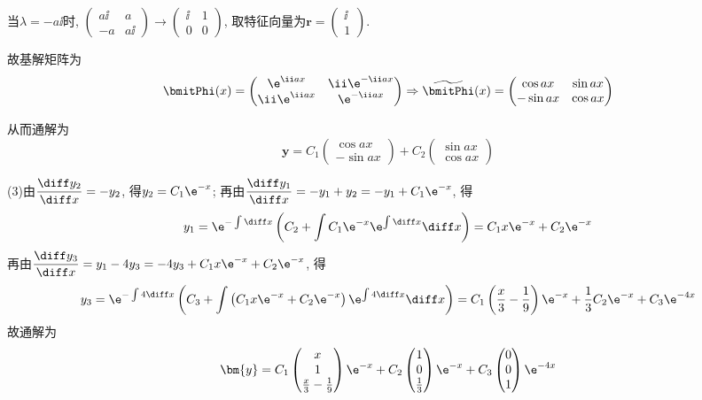 \begin{solve}
当$\lambda=-a\ii$时, $\begin{pmatrix}a\ii&a\\-a&a\ii\end{pmatrix}\to\begin{pmatrix}\ii&1\\0&0\end{pmatrix}$, 
取特征向量为$\bm{r}=\begin{pmatrix}\ii\\1\end{pmatrix}$.

故基解矩阵为
\[\bmitPhi(x)=\begin{pmatrix}\e^{\ii ax}&\ii\e^{-\ii ax}\\\ii\e^{\ii ax}&\e^{-\ii ax}\end{pmatrix}\Rightarrow\widetilde{\bmitPhi}(x)=\begin{pmatrix}\cos ax&\sin ax\\-\sin ax&\cos ax\end{pmatrix}\]

从而通解为
\[\bm{y}=C_1\begin{pmatrix}\cos ax\\-\sin ax\end{pmatrix}+C_2\begin{pmatrix}\sin ax\\\cos ax\end{pmatrix}\]

(3)由$\displaystyle\frac{\diff y_2}{\diff x}=-y_2$, 得$y_2=C_1\e^{-x}$; 
再由$\displaystyle\frac{\diff y_1}{\diff x}=-y_1+y_2=-y_1+C_1\e^{-x}$, 得
\[\displaystyle y_1=\e^{-\int\diff x}\left(C_2+\int C_1\e^{-x}\e^{\int\diff x}\diff x\right)=C_1x\e^{-x}+C_2\e^{-x}\]
再由$\displaystyle\frac{\diff y_3}{\diff x}=y_1-4y_3=-4y_3+C_1x\e^{-x}+C_2\e^{-x}$, 得
\[\displaystyle y_3=\e^{-\int4\diff x}\left(C_3+\int\left(C_1x\e^{-x}+C_2\e^{-x}\right)\e^{\int4\diff x}\diff x\right)=C_1\left(\frac{x}{3}-\frac{1}{9}\right)\e^{-x}+\frac{1}{3}C_2\e^{-x}+C_3\e^{-4x}\]
故通解为
\[\bm{y}=C_1\begin{pmatrix}x\\1\\\frac{x}{3}-\frac{1}{9}\end{pmatrix}\e^{-x}+C_2\begin{pmatrix}1\\0\\\frac{1}{3}\end{pmatrix}\e^{-x}+C_3\begin{pmatrix}0\\0\\1\end{pmatrix}\e^{-4x}\]


\end{solve}

